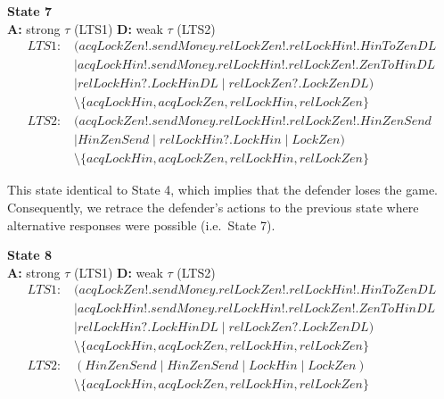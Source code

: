\documentclass{report}
\begin{document}
\begin{mdframed}
\textbf{State 7} \\
\textbf{A:} strong $\tau$ (LTS1) \quad \textbf{D:} weak $\tau$ (LTS2)
\begin{align*}
\textit{LTS1:}\; & (\mathit{acqLockZen!}.\mathit{sendMoney}.\mathit{relLockZen!}.\mathit{relLockHin!}.\mathit{HinToZenDL} \\
                 & \mid \mathit{acqLockHin!}.\mathit{sendMoney}.\mathit{relLockHin!}.\mathit{relLockZen!}.\mathit{ZenToHinDL} \\
                 & \mid \mathit{relLockHin?}.\mathit{LockHinDL} \mid \mathit{relLockZen?}.\mathit{LockZenDL}) \\
                 & \setminus \{\mathit{acqLockHin}, \mathit{acqLockZen}, \mathit{relLockHin}, \mathit{relLockZen}\} \\[6pt]
\textit{LTS2:}\; & (\mathit{acqLockZen!}.\mathit{sendMoney}.\mathit{relLockHin!}.\mathit{relLockZen!}.\mathit{HinZenSend} \\
                 & \mid \mathit{HinZenSend} \mid \mathit{relLockHin?}.\mathit{LockHin} \mid \mathit{LockZen}) \\
                 & \setminus \{\mathit{acqLockHin}, \mathit{acqLockZen}, \mathit{relLockHin}, \mathit{relLockZen}\}
\end{align*}
\end{mdframed}

\noindent This state identical to State 4, which implies that the defender loses the game.  Consequently, we retrace the defender's actions to the previous state where alternative responses were possible (i.e.\ State 7).

\begin{mdframed}
\textbf{State 8} \\
\textbf{A:} strong $\tau$ (LTS1) \quad \textbf{D:} weak $\tau$ (LTS2)
\begin{align*}
\textit{LTS1:}\; & (\mathit{acqLockZen!}.\mathit{sendMoney}.\mathit{relLockZen!}.\mathit{relLockHin!}.\mathit{HinToZenDL} \\
                 & \mid \mathit{acqLockHin!}.\mathit{sendMoney}.\mathit{relLockHin!}.\mathit{relLockZen!}.\mathit{ZenToHinDL} \\
                 & \mid \mathit{relLockHin?}.\mathit{LockHinDL} \mid \mathit{relLockZen?}.\mathit{LockZenDL}) \\
                 & \setminus \{\mathit{acqLockHin}, \mathit{acqLockZen}, \mathit{relLockHin}, \mathit{relLockZen}\} \\[6pt]
\textit{LTS2:}\; & (\mathit{HinZenSend} \mid \mathit{HinZenSend} \mid \mathit{LockHin} \mid \mathit{LockZen}) \\
                 & \setminus \{\mathit{acqLockHin}, \mathit{acqLockZen}, \mathit{relLockHin}, \mathit{relLockZen}\}
\end{align*}
\end{mdframed}
\end{document}
